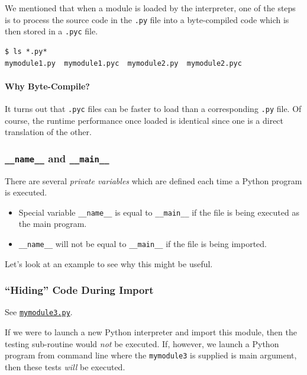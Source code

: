 \documentclass[12pt,letterpaper,twoside]{article}
\begin{document}
We mentioned that when a module is loaded by the interpreter, one of the steps is to
process the source code in the \texttt{.py} file into a byte-compiled code which is
then stored in a \texttt{.pyc} file.

\begin{verbatim}
$ ls *.py*
mymodule1.py  mymodule1.pyc  mymodule2.py  mymodule2.pyc
\end{verbatim}

\paragraph{Why Byte-Compile?} It turns out that \texttt{.pyc} files can be faster
to load than a corresponding \texttt{.py} file. Of course, the runtime performance once
loaded is identical since one is a direct translation of the other.

\subsubsection{\texttt{\_\_name\_\_} and \texttt{\_\_main\_\_}}
There are several \emph{private variables} which are defined each time a Python program
is executed.

\begin{itemize}
\item
  Special variable \texttt{\_\_name\_\_} is equal to
  \texttt{\_\_main\_\_} if the file is being executed as the main
  program.
\item
  \texttt{\_\_name\_\_} will not be equal to \texttt{\_\_main\_\_} if
  the file is being imported.
\end{itemize}

Let's look at an example to see why this might be useful.

\subsubsection{``Hiding'' Code During Import}

See 
\href{https://github.com/CME211/notes/blob/fall_18/lecture-05/mymodule3.py}
{\texttt{mymodule3.py}}.



If we were to launch a new Python interpreter and import this module,
then the testing sub-routine would \emph{not} be executed. If, however, we launch
a Python program from command line where the \texttt{mymodule3} is supplied is main argument,
then these tests \emph{will} be executed.
\end{document}
